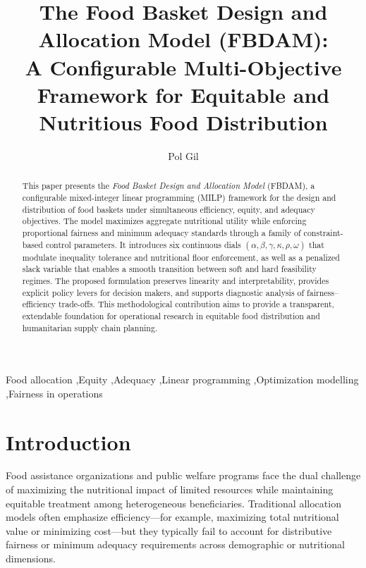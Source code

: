 \documentclass[preprint,12pt]{elsarticle}
\begin{document}
\begin{frontmatter}

\title{The Food Basket Design and Allocation Model (FBDAM):\\
A Configurable Multi-Objective Framework for Equitable and Nutritious Food Distribution}

\author{Pol Gil}
\address{Zero Hunger Lab, Tilburg University, The Netherlands\\
\texttt{pol.gil@tilburguniversity.edu}}

\begin{abstract}
This paper presents the \emph{Food Basket Design and Allocation Model} (FBDAM), a configurable mixed-integer linear programming (MILP) framework for the design and distribution of food baskets under simultaneous efficiency, equity, and adequacy objectives. The model maximizes aggregate nutritional utility while enforcing proportional fairness and minimum adequacy standards through a family of constraint-based control parameters. It introduces six continuous dials $(\alpha, \beta, \gamma, \kappa, \rho, \omega)$ that modulate inequality tolerance and nutritional floor enforcement, as well as a penalized slack variable that enables a smooth transition between soft and hard feasibility regimes. The proposed formulation preserves linearity and interpretability, provides explicit policy levers for decision makers, and supports diagnostic analysis of fairness--efficiency trade-offs. This methodological contribution aims to provide a transparent, extendable foundation for operational research in equitable food distribution and humanitarian supply chain planning.
\end{abstract}

\begin{keyword}
Food allocation \sep Equity \sep Adequacy \sep Linear programming \sep Optimization modelling \sep Fairness in operations
\end{keyword}

\end{frontmatter}

\section{Introduction}
Food assistance organizations and public welfare programs face the dual challenge of maximizing the nutritional impact of limited resources while maintaining equitable treatment among heterogeneous beneficiaries. Traditional allocation models often emphasize efficiency---for example, maximizing total nutritional value or minimizing cost---but they typically fail to account for distributive fairness or minimum adequacy requirements across demographic or nutritional dimensions. 
\end{document}
